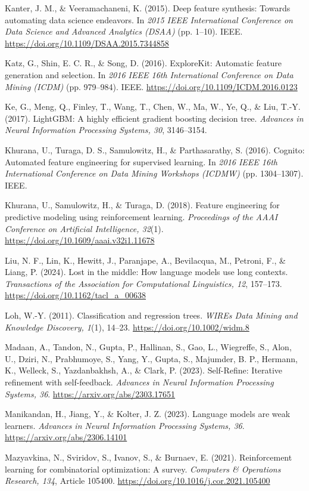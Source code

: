 \documentclass[11pt]{article}
\begin{document}
Kanter, J. M., \& Veeramachaneni, K. (2015). Deep feature synthesis: Towards automating data science
endeavors. In \emph{2015 IEEE International Conference on Data Science and Advanced Analytics
(DSAA)} (pp. 1--10). IEEE. \url{https://doi.org/10.1109/DSAA.2015.7344858}

Katz, G., Shin, E. C. R., \& Song, D. (2016). ExploreKit: Automatic feature generation and
selection. In \emph{2016 IEEE 16th International Conference on Data Mining (ICDM)} (pp. 979--984).
IEEE. \url{https://doi.org/10.1109/ICDM.2016.0123}

Ke, G., Meng, Q., Finley, T., Wang, T., Chen, W., Ma, W., Ye, Q., \& Liu, T.-Y. (2017). LightGBM: A
highly efficient gradient boosting decision tree. \emph{Advances in Neural Information Processing
Systems, 30}, 3146--3154.

Khurana, U., Turaga, D. S., Samulowitz, H., \& Parthasarathy, S. (2016). Cognito: Automated feature
engineering for supervised learning. In \emph{2016 IEEE 16th International Conference on Data Mining
Workshops (ICDMW)} (pp. 1304--1307). IEEE.

Khurana, U., Samulowitz, H., \& Turaga, D. (2018). Feature engineering for predictive modeling using
reinforcement learning. \emph{Proceedings of the AAAI Conference on Artificial Intelligence, 32}(1).
\url{https://doi.org/10.1609/aaai.v32i1.11678}

Liu, N. F., Lin, K., Hewitt, J., Paranjape, A., Bevilacqua, M., Petroni, F., \& Liang, P. (2024).
Lost in the middle: How language models use long contexts. \emph{Transactions of the Association for
Computational Linguistics, 12}, 157--173. \url{https://doi.org/10.1162/tacl_a_00638}

Loh, W.-Y. (2011). Classification and regression trees. \emph{WIREs Data Mining and Knowledge
Discovery, 1}(1), 14--23. \url{https://doi.org/10.1002/widm.8}

Madaan, A., Tandon, N., Gupta, P., Hallinan, S., Gao, L., Wiegreffe, S., Alon, U., Dziri, N.,
Prabhumoye, S., Yang, Y., Gupta, S., Majumder, B. P., Hermann, K., Welleck, S., Yazdanbakhsh, A., \&
Clark, P. (2023). Self-Refine: Iterative refinement with self-feedback. \emph{Advances in Neural
Information Processing Systems, 36}. \url{https://arxiv.org/abs/2303.17651}

Manikandan, H., Jiang, Y., \& Kolter, J. Z. (2023). Language models are weak learners.
\emph{Advances in Neural Information Processing Systems, 36}. \url{https://arxiv.org/abs/2306.14101}

Mazyavkina, N., Sviridov, S., Ivanov, S., \& Burnaev, E. (2021). Reinforcement learning for
combinatorial optimization: A survey. \emph{Computers \& Operations Research, 134}, Article 105400.
\url{https://doi.org/10.1016/j.cor.2021.105400}
\end{document}
